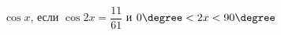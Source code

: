 \begin{ex}[type=simplify_calculate]
	\begin{condition}
		\( \cos x \), \quad если \( \cos2x=\dfrac{11}{61} \) и \( 0\degree<2x<90\degree \)
	\end{condition}
\end{ex}